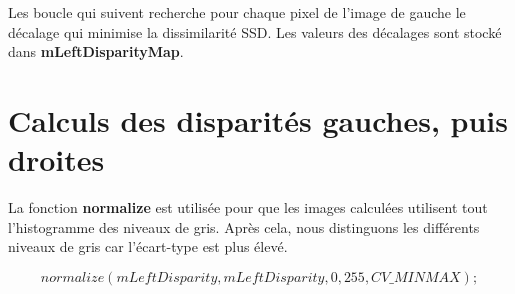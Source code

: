 \documentclass[a4paper,11pt]{article}
\begin{document}
Les boucle qui suivent recherche pour chaque pixel de l'image de
gauche le décalage qui minimise la dissimilarité SSD. Les valeurs
des décalages sont stocké dans \textbf{mLeftDisparityMap}.

\section{Calculs des disparités gauches, puis droites}

La fonction \textbf{normalize} est utilisée pour que les images calculées 
utilisent tout l'histogramme des niveaux de gris. Après cela, nous distinguons 
les différents niveaux de gris car l'écart-type est plus élevé.

$$
normalize(mLeftDisparity, mLeftDisparity, 0, 255, CV\_MINMAX);
$$


\begin{figure}[H]
  \centering
\end{figure}
\end{document}

